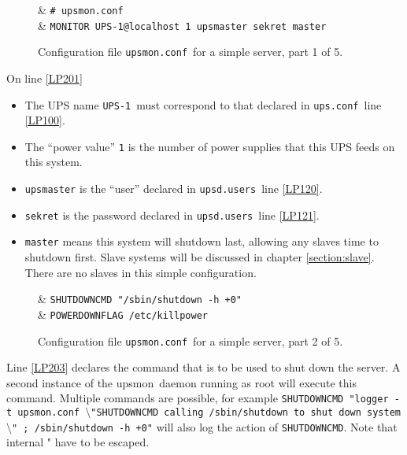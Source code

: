 \documentclass[12pt]{article}
\newcommand{\bsl}{$\setminus$}       %
\newcommand{\upsmon}{\mbox{\textcolor{MONCOLOUR}{upsmon}}}
\newcommand{\UPSi}{\texttt{UPS-1}}
\newcommand{\upsconf}{\textcolor{UPSDCOLOUR}{\texttt{ups.conf}}}
\newcommand{\upsdusers}{\textcolor{UPSDCOLOUR}{\texttt{upsd.users}}}
\newcommand{\upsmonconf}{\textcolor{MONCOLOUR}{\texttt{upsmon.conf}}}
\newcommand{\ul}{\begin{itemize}%
   \setlength{\itemsep}{0em}}
\newcommand{\eul}{\end{itemize}}
\newcommand{\li}{\item}                 %
\begin{document}
\begin{figure}[ht]
\begin{LinePrinter}[0.75\LinePrinterwidth]
\Clunk[LP200]  & \verb`# upsmon.conf` \\
\Clunk[LP201]  & \verb`MONITOR UPS-1@localhost 1 upsmaster sekret master` \\
\end{LinePrinter}
\vspace{-6mm}
\caption{Configuration file \upsmonconf\ for a simple server, part 1 of 5.\label{fig:upsmonconf1}}
\end{figure}

On line \ref{LP201}

\ul

\li The UPS name \UPSi\ must correspond to that declared in \upsconf\ line
\ref{LP100}.

\li The ``power value'' \texttt{1} is the number of power supplies that this
UPS feeds on this system.

\li \texttt{upsmaster} is the ``user'' declared in \upsdusers\ line \ref{LP120}.

\li \texttt{sekret} is the password declared in \upsdusers\ line \ref{LP121}.

\li \texttt{master} means this system will shutdown last, allowing any slaves
time to shutdown first.  Slave systems will be discussed in chapter
\ref{section:slave}. There are no slaves in this simple configuration.

\eul

\begin{figure}[ht]
\vspace{-6mm}
\begin{LinePrinter}[0.85\LinePrinterwidth]
\Clunk[LP203]  & \verb`SHUTDOWNCMD "/sbin/shutdown -h +0"` \\
\Clunk[LP209]  & \verb`POWERDOWNFLAG /etc/killpower` \\
\end{LinePrinter}
\vspace{-6mm}
\caption{Configuration file \upsmonconf\ for a simple server, part 2 of 5.\label{fig:upsmonconf2}}
\end{figure}

Line \ref{LP203} declares the command that is to be used to shut down the
server.  A second instance of the \upsmon\ daemon running as root will execute
this command.  Multiple commands are possible, for example \texttt{SHUTDOWNCMD
  "logger -t upsmon.conf \bsl"SHUTDOWNCMD calling /sbin/shutdown to shut down
  system\bsl" ; /sbin/shutdown -h +0"} will also log the action of
\texttt{SHUTDOWNCMD}.  Note that internal " have to be escaped.
\end{document}
